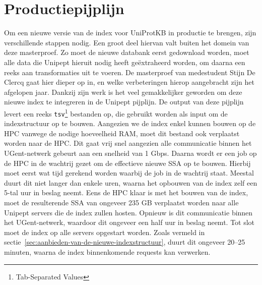 \section{Productiepijplijn}
Om een nieuwe versie van de index voor UniProtKB in productie te brengen, zijn verschillende stappen nodig.
Een groot deel hiervan valt buiten het domein van deze masterproef.
Zo moet de nieuwe databank eerst gedownload worden, moet alle data die Unipept hieruit nodig heeft geëxtraheerd worden, om daarna een reeks aan transformaties uit te voeren.
De masterproef van medestudent Stijn De Clercq gaat hier dieper op in, en welke verbeteringen hierop aangebracht zijn het afgelopen jaar.
Dankzij zijn werk is het veel gemakkelijker geworden om deze nieuwe index te integreren in de Unipept pijplijn.
De output van deze pijplijn levert een reeks \texttt{tsv}\footnote{Tab-Separated Values} bestanden op, die gebruikt worden als input om de indexstructuur op te bouwen.
Aangezien we de index enkel kunnen bouwen op de HPC vanwege de nodige hoeveelheid RAM, moet dit bestand ook verplaatst worden naar de HPC\@.
Dit gaat vrij snel aangezien alle communicatie binnen het UGent-netwerk gebeurt aan een snelheid van 1 Gbps.
Daarna wordt er een job op de HPC in de wachtrij gezet om de effectieve nieuwe SSA op te bouwen.
Hierbij moet eerst wat tijd gerekend worden waarbij de job in de wachtrij staat.
Meestal duurt dit niet langer dan enkele uren, waarna het opbouwen van de index zelf een 5-tal uur in beslag neemt.
Eens de HPC klaar is met het bouwen van de index, moet de resulterende SSA van ongeveer 235 GB verplaatst worden naar alle Unipept servers die de index zullen hosten.
Opnieuw is dit communicatie binnen het UGent-netwerk, waardoor dit ongeveer een half uur in beslag neemt.
Tot slot moet de index op alle servers opgestart worden.
Zoals vermeld in sectie~\ref{sec:aanbieden-van-de-nieuwe-indexstructuur}, duurt dit ongeveer 20--25 minuten, waarna de index binnenkomende requests kan verwerken.
